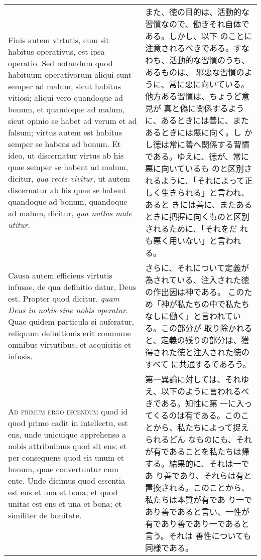 \documentclass[10pt]{jsarticle}
\begin{document}
\begin{longtable}{p{21em}p{21em}}
\\


Finis autem virtutis, cum sit habitus operativus, est ipsa
operatio. Sed notandum quod habituum operativorum aliqui sunt semper
ad malum, sicut habitus vitiosi; aliqui vero quandoque ad bonum, et
quandoque ad malum, sicut opinio se habet ad verum et ad falsum;
virtus autem est habitus semper se habens ad bonum. Et ideo, ut
discernatur virtus ab his quae semper se habent ad malum, dicitur,
{\itshape qua recte vivitur}, ut autem discernatur ab his quae se
habent quandoque ad bonum, quandoque ad malum, dicitur, {\itshape qua
nullus male utitur}.


&

また、徳の目的は、活動的な習慣なので、働きそれ自体である。しかし、以下
のことに注意されるべきである。すなわち、活動的な習慣のうち、あるものは、
邪悪な習慣のように、常に悪に向いている。他方ある習慣は、ちょうど意見が
真と偽に関係するように、あるときには善に、またあるときには悪に向く。し
かし徳は常に善へ関係する習慣である。ゆえに、徳が、常に悪に向いているも
のと区別されるように、「それによって正しく生きられる」と言われ、あると
きには善に、またあるときに把握に向くものと区別されるために、「それをだ
れも悪く用いない」と言われる。

\\


Causa autem efficiens virtutis infusae, de qua definitio datur, Deus
est. Propter quod dicitur, {\itshape quam Deus in nobis sine nobis
operatur}. Quae quidem particula si auferatur, reliquum definitionis
erit commune omnibus virtutibus, et acquisitis et infusis.

&

さらに、それについて定義が為されている、注入された徳の作出因は神である。
このため「神が私たちの中で私たちなしに働く」と言われている。この部分が
取り除かれると、定義の残りの部分は、獲得された徳と注入された徳のすべて
に共通するであろう。

\\



{\scshape Ad primum ergo dicendum} quod id quod primo cadit in
intellectu, est ens, unde unicuique apprehenso a nobis attribuimus
quod sit ens; et per consequens quod sit unum et bonum, quae
convertuntur cum ente. Unde dicimus quod essentia est ens et una et
bona; et quod unitas est ens et una et bona; et similiter de bonitate.

&

第一異論に対しては、それゆえ、以下のように言われるべきである。知性に第
一に入ってくるのは有である。このことから、私たちによって捉えられるどん
なものにも、それが有であることを私たちは帰する。結果的に、それは一であ
り善であり、それらは有と置換される。このことから、私たちは本質が有であ
り一であり善であると言い、一性が有であり善であり一であると言う。それは
善性についても同様である。



\end{longtable}
\end{document}
